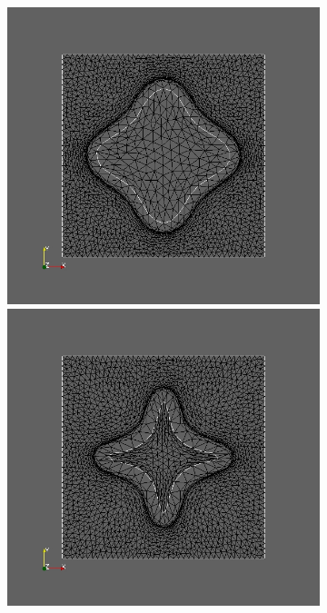 \begin{figure}
\begin{subfigure}{0.3\textwidth}
	\caption{}	
	\end{subfigure}
	\begin{subfigure}{0.3\textwidth}
	\centering
	\includegraphics[scale=0.2]{pic_bigcircle_constlame3.jpg}
	\caption{}	
	\centering
	\includegraphics[scale=0.2]{pic_bigcircle_constlame4.jpg}

\end{subfigure}
\end{figure}
